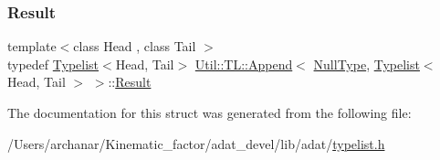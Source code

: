 \mbox{\label{structUtil_1_1TL_1_1Append_3_01NullType_00_01Typelist_3_01Head_00_01Tail_01_4_01_4_aa4d82c7dd5a87a41fa2e1a0046427d13}} 
\subsubsection{\texorpdfstring{Result}{Result}\hspace{0.1cm}{\footnotesize\ttfamily [2/2]}}
{\footnotesize\ttfamily template$<$class Head , class Tail $>$ \\
typedef \mbox{\hyperlink{structUtil_1_1Typelist}{Typelist}}$<$Head, Tail$>$ \mbox{\hyperlink{structUtil_1_1TL_1_1Append}{Util\+::\+T\+L\+::\+Append}}$<$ \mbox{\hyperlink{classUtil_1_1NullType}{Null\+Type}}, \mbox{\hyperlink{structUtil_1_1Typelist}{Typelist}}$<$ Head, Tail $>$ $>$\+::\mbox{\hyperlink{structUtil_1_1TL_1_1Append_3_01NullType_00_01Typelist_3_01Head_00_01Tail_01_4_01_4_aa4d82c7dd5a87a41fa2e1a0046427d13}{Result}}}



The documentation for this struct was generated from the following file\+:\begin{DoxyCompactItemize}
\item 
/\+Users/archanar/\+Kinematic\+\_\+factor/adat\+\_\+devel/lib/adat/\mbox{\hyperlink{lib_2adat_2typelist_8h}{typelist.\+h}}\end{DoxyCompactItemize}
